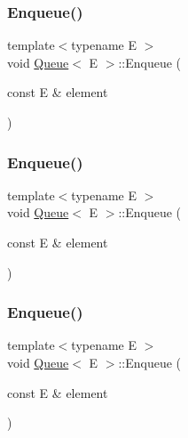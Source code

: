 \mbox{\label{class_queue_abaa2e7175457307bca74f5562cbdaaa9}} 
\subsubsection{\texorpdfstring{Enqueue()}{Enqueue()}\hspace{0.1cm}{\footnotesize\ttfamily [1/3]}}
{\footnotesize\ttfamily template$<$typename E $>$ \\
void \mbox{\hyperlink{class_queue}{Queue}}$<$ E $>$\+::Enqueue (\begin{DoxyParamCaption}\item[{const E \&}]{element }\end{DoxyParamCaption})\hspace{0.3cm}{\ttfamily [inline]}}

\mbox{\label{class_queue_abaa2e7175457307bca74f5562cbdaaa9}} 
\subsubsection{\texorpdfstring{Enqueue()}{Enqueue()}\hspace{0.1cm}{\footnotesize\ttfamily [2/3]}}
{\footnotesize\ttfamily template$<$typename E $>$ \\
void \mbox{\hyperlink{class_queue}{Queue}}$<$ E $>$\+::Enqueue (\begin{DoxyParamCaption}\item[{const E \&}]{element }\end{DoxyParamCaption})\hspace{0.3cm}{\ttfamily [inline]}}

\mbox{\label{class_queue_abaa2e7175457307bca74f5562cbdaaa9}} 
\subsubsection{\texorpdfstring{Enqueue()}{Enqueue()}\hspace{0.1cm}{\footnotesize\ttfamily [3/3]}}
{\footnotesize\ttfamily template$<$typename E $>$ \\
void \mbox{\hyperlink{class_queue}{Queue}}$<$ E $>$\+::Enqueue (\begin{DoxyParamCaption}\item[{const E \&}]{element }\end{DoxyParamCaption})\hspace{0.3cm}{\ttfamily [inline]}}

